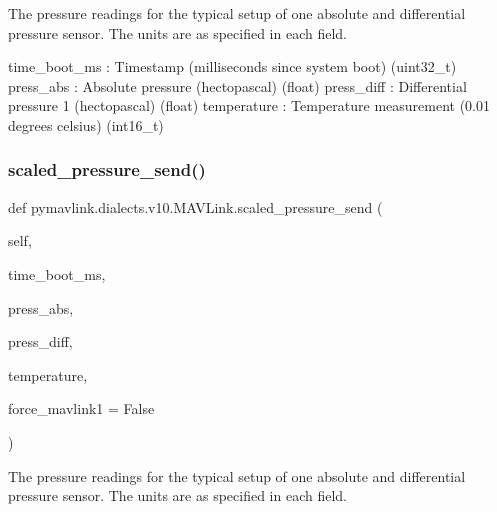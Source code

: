 \begin{DoxyVerb}
\begin{DoxyVerb}
\begin{DoxyVerb}
\begin{DoxyVerb}
\begin{DoxyVerb}
\begin{DoxyVerb}
\begin{DoxyVerb}
\begin{DoxyVerb}
\begin{DoxyVerb}
\begin{DoxyVerb}
\begin{DoxyVerb}The pressure readings for the typical setup of one absolute and
differential pressure sensor. The units are as
specified in each field.

time_boot_ms              : Timestamp (milliseconds since system boot) (uint32_t)
press_abs                 : Absolute pressure (hectopascal) (float)
press_diff                : Differential pressure 1 (hectopascal) (float)
temperature               : Temperature measurement (0.01 degrees celsius) (int16_t)\end{DoxyVerb}
 \mbox{\label{classpymavlink_1_1dialects_1_1v10_1_1MAVLink_ac667ab85658b7ed0dbf8a231b5895ec6}} 
\subsubsection{\texorpdfstring{scaled\+\_\+pressure\+\_\+send()}{scaled\_pressure\_send()}}
{\footnotesize\ttfamily def pymavlink.\+dialects.\+v10.\+M\+A\+V\+Link.\+scaled\+\_\+pressure\+\_\+send (\begin{DoxyParamCaption}\item[{}]{self,  }\item[{}]{time\+\_\+boot\+\_\+ms,  }\item[{}]{press\+\_\+abs,  }\item[{}]{press\+\_\+diff,  }\item[{}]{temperature,  }\item[{}]{force\+\_\+mavlink1 = {\ttfamily False} }\end{DoxyParamCaption})}

\begin{DoxyVerb}The pressure readings for the typical setup of one absolute and
differential pressure sensor. The units are as
specified in each field.


\end{DoxyVerb}
\end{DoxyVerb}
\end{DoxyVerb}
\end{DoxyVerb}
\end{DoxyVerb}
\end{DoxyVerb}
\end{DoxyVerb}
\end{DoxyVerb}
\end{DoxyVerb}
\end{DoxyVerb}
\end{DoxyVerb}
